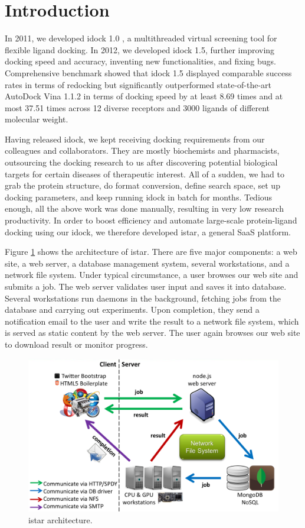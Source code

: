 \documentclass{bioinfo}
\begin{document}
\section{Introduction}

In 2011, we developed idock 1.0 \citep{1153}, a multithreaded virtual screening tool for flexible ligand docking. In 2012, we developed idock 1.5, further improving docking speed and accuracy, inventing new functionalities, and fixing bugs. Comprehensive benchmark showed that idock 1.5 displayed comparable success rates in terms of redocking but significantly outperformed state-of-the-art AutoDock Vina 1.1.2 \citep{595} in terms of docking speed by at least 8.69 times and at most 37.51 times across 12 diverse receptors and 3000 ligands of different molecular weight.

Having released idock, we kept receiving docking requirements from our colleagues and collaborators. They are mostly biochemists and pharmacists, outsourcing the docking research to us after discovering potential biological targets for certain diseases of therapeutic interest. All of a sudden, we had to grab the protein structure, do format conversion, define search space, set up docking parameters, and keep running idock in batch for months. Tedious enough, all the above work was done manually, resulting in very low research productivity. In order to boost efficiency and automate large-scale protein-ligand docking using our idock, we therefore developed istar, a general SaaS platform.

Figure \ref{istar:architecture} shows the architecture of istar. There are five major components: a web site, a web server, a database management system, several workstations, and a network file system. Under typical circumstance, a user browses our web site and submits a job. The web server validates user input and saves it into database. Several workstations run daemons in the background, fetching jobs from the database and carrying out experiments. Upon completion, they send a notification email to the user and write the result to a network file system, which is served as static content by the web server. The user again browses our web site to download result or monitor progress.

\begin{figure}
\centerline{\includegraphics[width=\linewidth]{Architecture.png}}
\caption{istar architecture.}\label{istar:architecture}
\end{figure}
\end{document}
